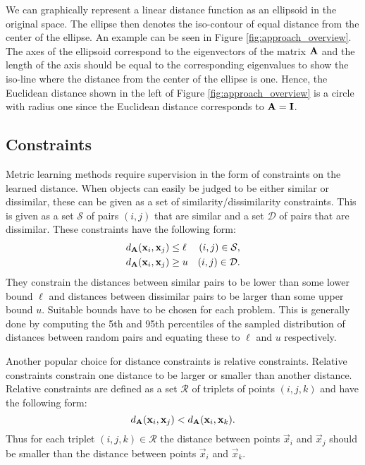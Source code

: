 We can graphically represent a linear distance function as an ellipsoid in the original space. The ellipse then denotes the iso-contour of equal distance from the center of the ellipse. An example can be seen in Figure \ref{fig:approach_overview}. The axes of the ellipsoid correspond to the eigenvectors of the matrix $\mathbf{A}$ and the length of the axis should be equal to the corresponding eigenvalues to show the iso-line where the distance from the center of the ellipse is one. Hence, the Euclidean distance shown in the left of Figure \ref{fig:approach_overview} is a circle with radius one since the Euclidean distance corresponds to $\mathbf{A} = \mathbf{I}$. 



\subsection{Constraints}

Metric learning methods require supervision in the form of constraints on the learned distance. When objects can easily be judged to be either similar or dissimilar, these can be given as a set of similarity/dissimilarity constraints. This is given as a set $\mathcal{S}$ of pairs $(i, j)$ that are similar and a set $\mathcal{D}$ of pairs that are dissimilar. These constraints have the following form:
\begin{subequations}
\begin{align}
d_{\mathbf{A}}(\mathbf{x}_i, \mathbf{x}_j) &\leq \ell & (i, j) \in \mathcal{S}, \\
d_{\mathbf{A}}(\mathbf{x}_i, \mathbf{x}_j) &\geq u & (i, j) \in \mathcal{D}.
\end{align}
\end{subequations}
They constrain the distances between similar pairs to be lower than some lower bound $\ell$ and distances between dissimilar pairs to be larger than some upper bound $u$. Suitable bounds have to be chosen for each problem. This is generally done by computing the 5th and 95th percentiles of the sampled distribution of distances between random pairs and equating these to $\ell$ and $u$ respectively.

Another popular choice for distance constraints is relative constraints. Relative constraints constrain one distance to be larger or smaller than another distance. Relative constraints are defined as a set $\mathcal{R}$ of triplets of points $(i,j,k)$ and have the following form:
\begin{equation}
d_{\mathbf{A}}(\mathbf{x}_i, \mathbf{x}_j) < d_{\mathbf{A}}(\mathbf{x}_i, \mathbf{x}_k).
\end{equation}
Thus for each triplet $(i,j,k) \in \mathcal{R}$ the distance between points $\vec{x}_i$ and $\vec{x}_j$ should be smaller than the distance between points $\vec{x}_i$ and $\vec{x}_k$.

